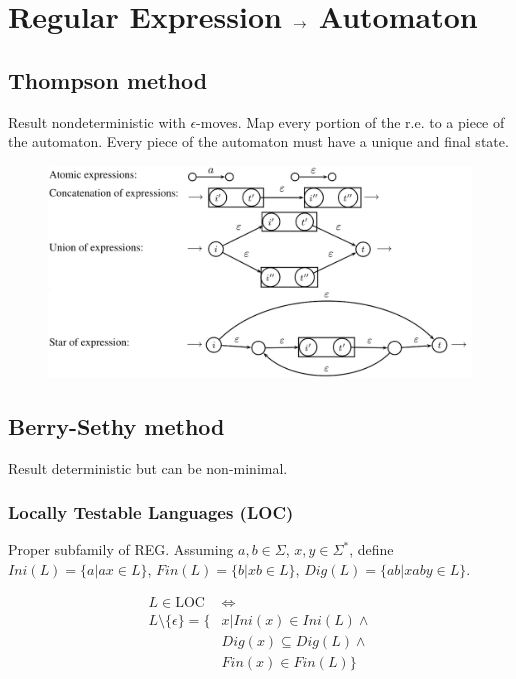 \newpage
\section{Regular Expression $\rightarrow$ Automaton}

\subsection{Thompson method}
Result nondeterministic with $\epsilon$-moves. Map every portion of the r.e. to a piece of the automaton. Every piece of the automaton must have a unique and final state.

\begin{figure}[H]
    \centering
    \includegraphics[width=\linewidth]{automata/thompson.png}
\end{figure}

\subsection{Berry-Sethy method}

Result deterministic but can be non-minimal.

\subsubsection{Locally Testable Languages (LOC)}

Proper subfamily of REG. Assuming $a,b \in \Sigma$, $x, y \in \Sigma^*$, define $Ini(L) = \{a | ax \in L\}$, $Fin(L) = \{b | xb \in L\}$, $Dig(L) = \{ab | xaby \in L\}$.

\begin{align*}
    L \in \text{LOC} &\iff \\
    L \setminus \{\epsilon\} = \{&x | Ini(x) \in Ini(L) \land \\
    &Dig(x) \subseteq Dig(L) \land \\
    &Fin(x) \in Fin(L) \}
\end{align*}

